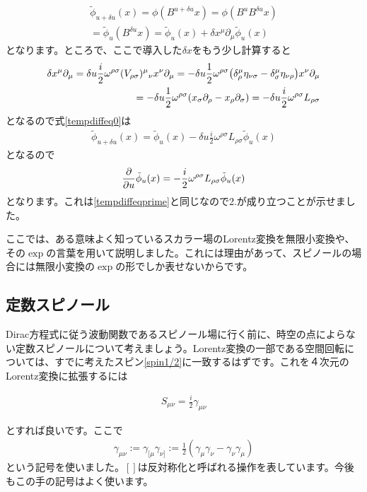 \documentclass[report,paper=a4, fontsize=12pt, line_length=16cm, number_of_lines=33,dvipdfmx]{jlreq}
\newenvironment{important}{\begin{tcolorbox}[
  colback = white,
  colframe = red!35,
  boxrule = 2mm,
  fonttitle = \bfseries,
  after = \noindent] }{\end{tcolorbox}}
\numberwithin{equation}{chapter}
\newcommand{\del}{\partial}
\newcommand{\phit}{\tilde{\phi}}
\begin{document}
\begin{align}
  \phit_{u+\delta u}(x)
  =\phi(B^{u+\delta u}x)
  =\phi(B^{u}B^{\delta u}x)\nonumber\\
  =\phit_u(B^{\delta u}x)
  =\phit_u(x)+\delta x^{\mu}\del_{\mu}\phit_{u}(x)\label{tempdiffeq0}
\end{align}
となります。ところで、ここで導入した$\delta x$をもう少し計算すると
\begin{align}
  \delta x^{\mu}\del_{\mu}=\delta u\frac{i}{2}\omega^{\rho\sigma}(V_{\rho\sigma})^{\mu}{}_{\nu}x^{\nu}\del_{\mu}
  =-\delta u\frac{1}{2}\omega^{\rho\sigma}\qty(\delta^{\mu}_{\rho}\eta_{\nu\sigma}-\delta^{\mu}_{\sigma}\eta_{\nu\rho})x^{\nu}\del_{\mu}\nonumber\\
  =-\delta u\frac{1}{2}\omega^{\rho\sigma}\qty(x_{\sigma}\del_{\rho}-x_{\rho}\del_{\sigma})
  =-\delta u \frac{i}{2}\omega^{\rho\sigma}L_{\rho\sigma}
\end{align}
となるので式\eqref{tempdiffeq0}は
\begin{align}
\phit_{u+\delta u}(x)=\phit_{u}(x) - \delta u\frac{i}{2}\omega^{\rho\sigma}L_{\rho\sigma}\phit_{u}(x)
\end{align}
となるので
\begin{align}
  \pdv{u} \phit_{u}(x)=-\frac{i}{2}\omega^{\rho\sigma}L_{\rho\sigma}\phit_{u}(x)
\end{align}
となります。これは\eqref{tempdiffeqprime}と同じなので2.が成り立つことが示せました。

ここでは、ある意味よく知っているスカラー場のLorentz変換を無限小変換や、その$\exp$の言葉を用いて説明しました。これには理由があって、スピノールの場合には無限小変換の$\exp$の形でしか表せないからです。

\subsection{定数スピノール}
Dirac方程式に従う波動関数であるスピノール場に行く前に、時空の点によらない定数スピノールについて考えましょう。Lorentz変換の一部である空間回転については、すでに考えたスピン\eqref{spin1/2}に一致するはずです。これを４次元のLorentz変換に拡張するには
\begin{important}
  \begin{align}
    S_{\mu\nu}=\frac{i}{2}\gamma_{\mu\nu}
  \end{align}
\end{important}
とすれば良いです。ここで
\begin{align}
  \gamma_{\mu\nu}:=\gamma_{[\mu}\gamma_{\nu]}:=\frac{1}{2}(\gamma_{\mu}\gamma_{\nu}-\gamma_{\nu}\gamma_{\mu})
\end{align}
という記号を使いました。$[]$は反対称化と呼ばれる操作を表しています。今後もこの手の記号はよく使います。
\end{document}
